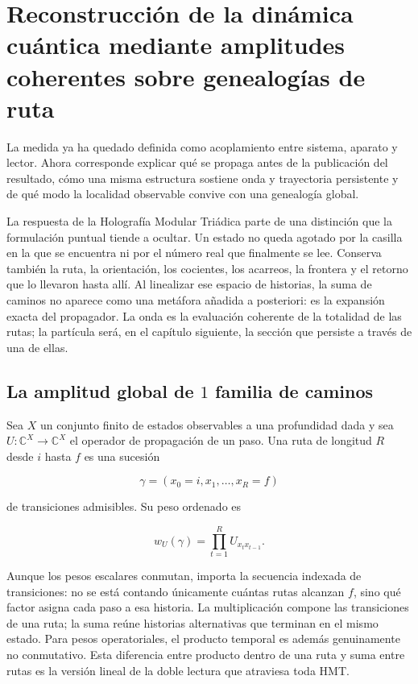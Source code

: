 \chapter{Reconstrucción de la dinámica cuántica mediante amplitudes coherentes sobre genealogías de ruta}


La medida ya ha quedado definida como acoplamiento entre sistema, aparato y lector.
Ahora corresponde explicar qué se propaga antes de la publicación del resultado,
cómo una misma estructura sostiene onda y trayectoria persistente y de qué modo la
localidad observable convive con una genealogía global.

La respuesta de la Holografía Modular Triádica parte de una distinción que la
formulación puntual tiende a ocultar. Un estado no queda agotado por la casilla en
la que se encuentra ni por el número real que finalmente se lee. Conserva también
la ruta, la orientación, los cocientes, los acarreos, la frontera y el retorno que
lo llevaron hasta allí. Al linealizar ese espacio de historias, la suma de caminos
no aparece como una metáfora añadida a posteriori: es la expansión exacta del
propagador. La onda es la evaluación coherente de la totalidad de las rutas; la
partícula será, en el capítulo siguiente, la sección que persiste a través de una
de ellas.

\section{La amplitud global de \(1\) familia de caminos}

Sea \(X\) un conjunto finito de estados observables a una profundidad dada y sea
\(U:\mathbb C^X\to\mathbb C^X\) el operador de propagación de un paso. Una ruta de
longitud \(R\) desde \(i\) hasta \(f\) es una sucesión

\[
  \gamma=(x_0=i,x_1,\ldots,x_R=f)
\]

de transiciones admisibles. Su peso ordenado es

\[
  w_U(\gamma)=\prod_{t=1}^{R}U_{x_t x_{t-1}}.
\]

Aunque los pesos escalares conmutan, importa la secuencia indexada de transiciones:
no se está contando únicamente cuántas rutas alcanzan \(f\), sino qué factor asigna
cada paso a esa historia. La multiplicación compone las transiciones de una ruta; la
suma reúne historias alternativas que terminan en el mismo estado. Para pesos
operatoriales, el producto temporal es además genuinamente no conmutativo. Esta
diferencia entre producto dentro de una ruta y suma entre rutas es la versión lineal
de la doble lectura que atraviesa toda HMT.

